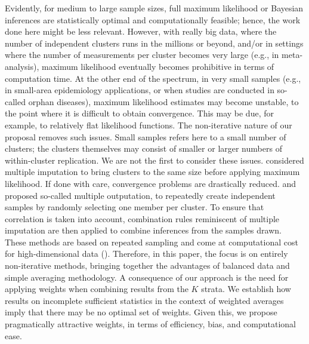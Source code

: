 \documentclass[11pt,a5paper,twoside]{book}
\begin{document}
Evidently, for medium to large sample sizes, full maximum likelihood or Bayesian inferences are statistically optimal and computationally feasible; hence, the work done here might be less relevant. However, with really big data, where the number of independent clusters runs in the millions or beyond, and/or in settings where the number of measurements per cluster becomes very large (e.g., in meta-analysis), maximum likelihood eventually becomes prohibitive in terms of computation time. At the other end of the spectrum, in very small samples (e.g., in small-area epidemiology applications, or when studies are conducted in so-called orphan diseases), maximum likelihood estimates may become unstable, to the point where it is difficult to obtain convergence.  This may be due, for example, to relatively flat likelihood functions. The non-iterative nature of our proposal removes such issues. Small samples refers here to a small number of clusters; the clusters themselves may consist of smaller or larger numbers of within-cluster replication. 
We are not the first to consider these issues. \cite{wim2015} considered multiple imputation to bring clusters to the same size before applying maximum likelihood. If done with care, convergence problems are drastically reduced. \cite{williamson2003marginal} and \cite{follmann2003} proposed so-called multiple outputation, to repeatedly create independent samples by randomly selecting one member per cluster.  To ensure that correlation is taken into account, combination rules reminiscent of multiple imputation are then applied to combine inferences from the samples drawn. These methods are based on repeated sampling and  come at computational cost for high-dimensional data (\cite{sikorska2013_2}). Therefore, in this paper, the focus is on entirely non-iterative methods, bringing together the advantages of balanced data and simple averaging methodology. A consequence of our approach is the need for applying weights when combining results from the $K$ strata.  We establish how results on incomplete sufficient statistics in the context of weighted averages \citep{molenberghs2014random, Lisa2015_2} imply that there may be no optimal set of weights. Given this, we propose pragmatically attractive weights, in terms of efficiency, bias, and computational ease.
\end{document}
